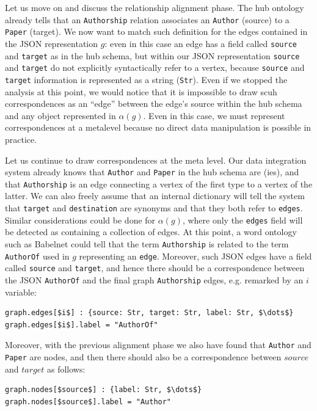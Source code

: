 \begin{example}[label=ex:examplegraphdata]
Let us move on and discuss the relationship alignment phase. %
The hub ontology already tells that an \texttt{Authorship} relation associates an \texttt{Author} (source) to a \texttt{Paper} (target). We now want to match such definition for the edges contained in the JSON representation $g$: even in this case an edge has a field called \texttt{source} and \texttt{target} as in the hub schema, but within our JSON representation \texttt{source} and \texttt{target} do not explicitly syntactically refer to a vertex, because \texttt{source} and \texttt{target} information is represented as a string (\texttt{Str}). Even if we stopped the analysis at this point, we would notice that it is impossible to draw scuh correspondences as an ``edge'' between the edge's source within the hub schema and any object represented in $\alpha(g)$. Even in this case, we must represent correspondences at a metalevel because no direct data manipulation is possible in practice.

Let us continue to draw correspondences at the meta level. Our data integration system already knows that \texttt{Author} and \texttt{Paper} in the hub schema are \ONTA(ies), and that \texttt{Authorship} is an edge connecting a vertex of the first type to a vertex of the latter. We can also freely assume that an internal dictionary will tell the system that \texttt{target} and \texttt{destination} are synonyms and that they both refer to \texttt{edges}. Similar considerations could be done for $\alpha(g)$, where only the \texttt{edges} field will be detected as containing a collection of edges. At this point, a word ontology such as Babelnet \cite{Navigli12} could tell that the term \texttt{Authorship} is related to the term \texttt{AuthorOf} used in $g$ representing an \texttt{edge}. Moreover, such JSON edges have a field called \texttt{source} and \texttt{target}, and hence there should be a correspondence between the JSON \texttt{AuthorOf} and the final graph \texttt{Authorship} edges, e.g. remarked by an $i$ variable:
\begin{lstlisting}[language=theoryjson,basicstyle=\ttfamily\small,mathescape=true]
graph.edges[$i$] : {source: Str, target: Str, label: Str, $\dots$}
graph.edges[$i$].label = "AuthorOf"
\end{lstlisting}
Moreover, with the previous alignment phase we also have found that \texttt{Author} and \texttt{Paper} are nodes, and then there should also be a correspondence between $source$ and $target$ as follows:
\begin{lstlisting}[language=theoryjson,basicstyle=\ttfamily\small,mathescape=true]
graph.nodes[$source$] : {label: Str, $\dots$}
graph.nodes[$source$].label = "Author"


\end{lstlisting}
\end{example}
